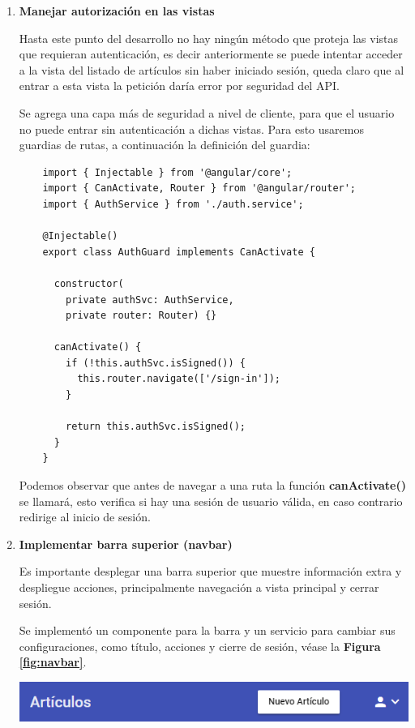 \begin{enumerate}
  \smallbreak
  \item\textbf{Manejar autorización en las vistas}
  \smallbreak
  
  Hasta este punto del desarrollo no hay ningún método que proteja las vistas que requieran autenticación, es decir anteriormente se puede intentar acceder a la vista del listado de artículos sin haber iniciado sesión, queda claro que al entrar a esta vista la petición daría error por seguridad del API.
  
  Se agrega una capa más de seguridad a nivel de cliente, para que el usuario no puede entrar sin autenticación a dichas vistas. Para esto usaremos guardias de rutas, a continuación la definición del guardia:
  \begin{verbatim}
    import { Injectable } from '@angular/core';
    import { CanActivate, Router } from '@angular/router';
    import { AuthService } from './auth.service';
    
    @Injectable()
    export class AuthGuard implements CanActivate {
    
      constructor(
        private authSvc: AuthService,
        private router: Router) {}
    
      canActivate() {
        if (!this.authSvc.isSigned()) {
          this.router.navigate(['/sign-in']);
        }
    
        return this.authSvc.isSigned();
      }
    }
  \end{verbatim}
  
  Podemos observar que antes de navegar a una ruta la función \textbf{canActivate()} se llamará, esto verifica si hay una sesión de usuario válida, en caso contrario redirige al inicio de sesión.
  
  \smallbreak
  \item\textbf{Implementar barra superior (navbar)}
  \smallbreak

  Es importante desplegar una barra superior que muestre información extra y despliegue acciones, principalmente navegación a vista principal y cerrar sesión.
  
  
  Se implementó un componente para la barra y un servicio para cambiar sus configuraciones, como título, acciones y cierre de sesión, véase la \textbf{Figura \ref{fig:navbar}}.
  
  \begin{center}
      \bigbreak
      \includegraphics[scale=0.6]{images/marco_aplicativo/navbar.png}
      \label{fig:navbar}
      \bigbreak
  \end{center} 
  

\end{enumerate}
